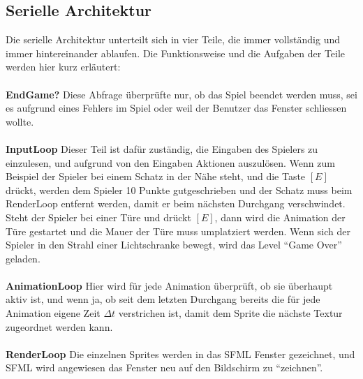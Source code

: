 \documentclass[11pt,a4paper]{scrbook}
\newcommand{\q}[1]{``#1''}
\begin{document}
\subsection{Serielle Architektur}
Die serielle Architektur unterteilt sich in vier Teile, die immer vollständig und immer hintereinander ablaufen. Die Funktionsweise
und die Aufgaben der Teile werden hier kurz erläutert:\\
\\
\textbf{EndGame?}
Diese Abfrage überprüfte nur, ob das Spiel beendet werden muss, sei es aufgrund eines Fehlers im Spiel
oder weil der Benutzer das Fenster schliessen wollte.\\
\\
\textbf{InputLoop}
Dieser Teil ist dafür zuständig, die Eingaben des Spielers zu einzulesen, und aufgrund von den Eingaben Aktionen auszulösen. Wenn zum Beispiel
der Spieler bei einem Schatz in der Nähe steht, und die Taste $[E]$ drückt, werden dem Spieler 10 Punkte gutgeschrieben und der Schatz muss beim
RenderLoop entfernt werden, damit er beim nächsten Durchgang verschwindet. Steht der Spieler bei einer Türe und drückt $[E]$, dann wird die Animation
der Türe gestartet und die Mauer der Türe muss umplatziert werden. Wenn sich der Spieler in den Strahl einer Lichtschranke bewegt, wird das Level
\q{Game Over} geladen.\\
\\
\textbf{AnimationLoop}
Hier wird für jede Animation überprüft, ob sie überhaupt aktiv ist, und wenn ja, ob seit dem letzten Durchgang bereits die für jede Animation
eigene Zeit $\Delta t$ verstrichen ist, damit dem Sprite die nächste Textur zugeordnet werden kann.\\
\\
\textbf{RenderLoop}
Die einzelnen Sprites werden in das SFML Fenster gezeichnet, und SFML wird angewiesen das Fenster neu auf den Bildschirm zu \q{zeichnen}.
\end{document}

